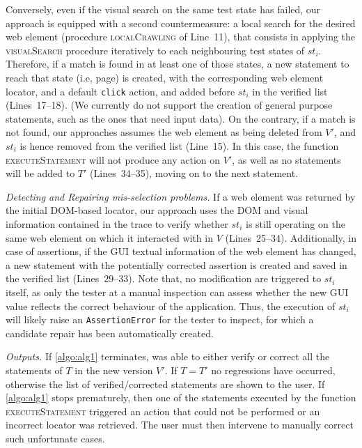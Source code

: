 Conversely, even if the visual search on the same test state has failed, our approach is equipped with a second countermeasure: a local search for the desired web element (procedure \textsc{localCrawling} of Line~11), that consists in applying the \textsc{visualSearch} procedure iteratively to each neighbouring test states of $st_i$. Therefore, if a match is found in at least one of those states, a new statement to reach that state (i.e, page) is created, with the corresponding web element locator, and a default \texttt{click} action, and added before $st_i$ in the verified list (Lines~17--18). (We currently do not support the creation of general purpose statements, such as the ones that need input data).
On the contrary, if a match is not found, our approaches assumes the web element as being deleted from $V'$, and $st_i$ is hence removed from the verified list (Line~15). In this case, the function \textsc{executeStatement} will not produce any action on $V'$, as well as no statements will be added to $T'$ (Lines~34--35), moving on to the next statement.

\textit{Detecting and Repairing mis-selection problems.}
If a web element was returned by the initial DOM-based locator, our approach uses the DOM and visual information contained in the trace to verify whether $st_i$ is still operating on the same web element on which it interacted with in $V$ (Lines~25--34). Additionally, in case of assertions, if the GUI textual information of the web element has changed, a new statement with the potentially corrected assertion is created and saved in the verified list (Lines~29--33). Note that, no modification are triggered to $st_i$ itself, as only the tester at a manual inspection can assess whether the new GUI value reflects the correct behaviour of the application. Thus, the execution of $st_i$ will likely raise an \texttt{AssertionError} for the tester to inspect, for which a candidate repair has been automatically created.

\textit{Outputs.}
If \autoref{algo:alg1} terminates, \tool was able to either verify or correct all the statements of $T$ in the new version $V'$. If $T = T'$ no regressions have occurred, otherwise the list of verified/corrected statements are shown to the user.
If \autoref{algo:alg1} stops prematurely, then one of the statements executed by the function \textsc{executeStatement} triggered an action that could not be performed or an incorrect locator was retrieved. The user must then intervene to manually correct such unfortunate cases.

